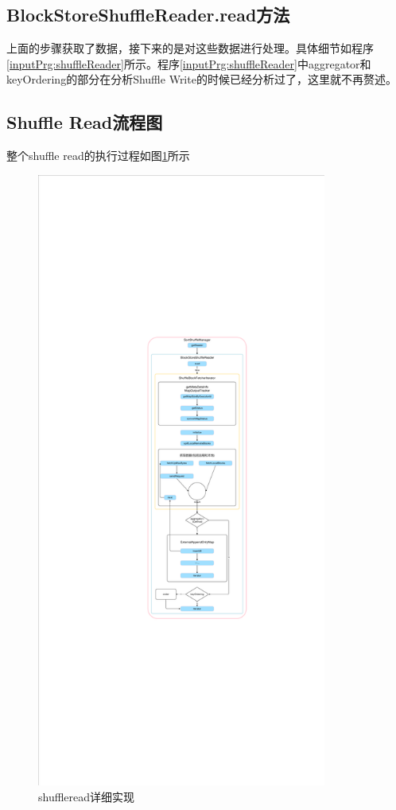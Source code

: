 \subsection{BlockStoreShuffleReader.read方法}
上面的步骤获取了数据，接下来的是对这些数据进行处理。具体细节如程序\ref{inputPrg:shuffleReader}所示。程序\ref{inputPrg:shuffleReader}中aggregator和keyOrdering的部分在分析Shuffle Write的时候已经分析过了，这里就不再赘述。
\subsection{Shuffle Read流程图}
整个shuffle read的执行过程如图\ref{fig:shuffleread}所示
\begin{figure}[H] 
	\centering
	\includegraphics[width=0.85\textwidth,height=0.97\textheight]{figures/sortShuffleReadDia.pdf}
	\caption{shuffleread详细实现}
	\label{fig:shuffleread}
\end{figure}
